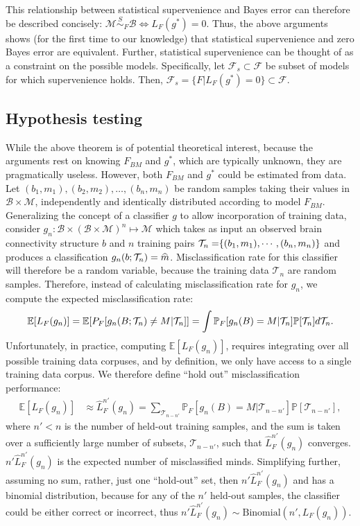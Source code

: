 \documentclass{article}
\newcommand{\mB}{\mathcal{B}}
\newcommand{\mM}{\mathcal{M}}
\newcommand{\PP}{\mathbb{P}}           %
\newcommand{\EE}{\mathbb{E}}           %
\providecommand{\mc}[1]{\mathcal{#1}}
\providecommand{\mh}[1]{\widehat{#1}}
\newcommand{\hL}{\widehat{L}}
\newcommand{\MsB}{\mM \overset{S}{\sim}_F \mB}
\providecommand{\tr}[1]{\textcolor{black}{#1}}
\begin{document}
This relationship between statistical supervenience and Bayes error can therefore be described concisely: \mbox{$\MsB \Leftrightarrow L_F(g^*)=0$}.  Thus, the above arguments shows (for the first time to our knowledge) that statistical supervenience and zero Bayes error are equivalent. Further, statistical supervenience can be thought of as a constraint on the possible models.  Specifically, let $\mc{F}_s \subset \mc{F}$ be subset of models for which supervenience holds.  Then, $\mc{F}_s = \{F | L_F(g^*)=0\} \subset \mc{F}$.


\subsection{Hypothesis testing} %
\label{sub:hypothesis_testing}

While the above theorem is of potential theoretical interest, because the arguments rest on knowing $F_{BM}$ and $g^*$, which are typically unknown, they are pragmatically useless.  However, both $F_{BM}$ and $g^*$ could be estimated from data.  Let $(b_1,m_1), (b_2,m_2), \ldots, (b_n,m_n)$ be random samples taking their values in $\mB \times \mM$, independently and identically distributed according to model $F_{BM}$.  Generalizing the concept of a classifier $g$ to allow incorporation of training data, consider $g_n:\mB \times (\mB \times \mM)^n \mapsto \mM$ which takes as input an observed brain connectivity structure $b$ and $n$ training pairs $\tr{\mc{T}_n=}\{(b_1,m_1),\cdots,(b_n,m_n)\}$ and produces a classification $g_n(b;\tr{\mc{T}_n})=\mh{m}$.  Misclassification rate for this classifier will therefore be a random variable, because the training data $\mc{T}_n$ are random samples.  Therefore, instead of calculating misclassification rate for $g_n$, we compute the expected misclassification rate: %
\begin{align}
\EE[L_{F}(g_n)] = \EE[P_{F}[g_n(B;\tr{\mc{T}_n}) \neq M|\tr{\mc{T}_n}]] = \int \PP_F[g_n(B)=M | \mc{T}_n] \PP[\mc{T}_n] d\mc{T}_n.
\end{align}
Unfortunately, in practice, computing $\EE[L_F(g_n)]$, requires integrating over all possible training data corpuses, and by definition, we only have access to a single training data corpus.  We therefore define ``hold out'' misclassification performance:
\begin{align}
\EE[L_F(g_n)] %
&\approx  \hL^{n'}_{F}(g_n) = \sum_{\mc{T}_{n-n'}} \PP_F[g_n(B)=M | \mc{T}_{n-n'}] \PP[\mc{T}_{n-n'}],
\end{align}
where $n'<n$ is the number of held-out training samples, and the sum is taken over a sufficiently large number of subsets, $\mc{T}_{n-n'}$, such that $\hL^{n'}_F(g_n)$ converges.   $n' \hL^{n'}_{F}(g_n)$ is the expected number of misclassified minds.  Simplifying further, assuming no sum, rather, just one ``hold-out'' set, then $n' \hL^{n'}_{F}(g_n)$ and has a binomial distribution, because for any of the $n'$ held-out samples, the classifier could be either correct or incorrect, thus $n' \hL^{n'}_{F}(g_n) \sim \text{Binomial}(n',L_{F}(g_n))$.
\end{document}
